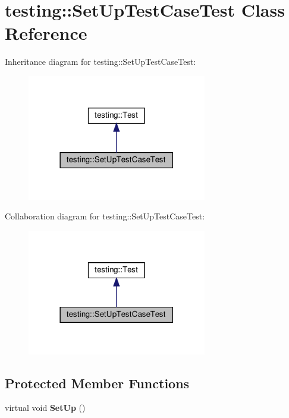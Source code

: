 \hypertarget{classtesting_1_1_set_up_test_case_test}{}\section{testing\+:\+:Set\+Up\+Test\+Case\+Test Class Reference}
\label{classtesting_1_1_set_up_test_case_test}


Inheritance diagram for testing\+:\+:Set\+Up\+Test\+Case\+Test\+:
\nopagebreak
\begin{figure}[H]
\begin{center}
\leavevmode
\includegraphics[width=222pt]{classtesting_1_1_set_up_test_case_test__inherit__graph}
\end{center}
\end{figure}


Collaboration diagram for testing\+:\+:Set\+Up\+Test\+Case\+Test\+:
\nopagebreak
\begin{figure}[H]
\begin{center}
\leavevmode
\includegraphics[width=222pt]{classtesting_1_1_set_up_test_case_test__coll__graph}
\end{center}
\end{figure}
\subsection*{Protected Member Functions}
\begin{DoxyCompactItemize}
\item 
\mbox{\label{classtesting_1_1_set_up_test_case_test_a4b44551ccf73e66de7ec95b2ab3b2085}} 
virtual void {\bfseries Set\+Up} ()
\end{DoxyCompactItemize}
